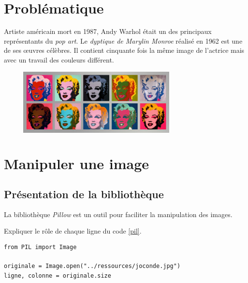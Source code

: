 \documentclass[a4paper,11pt]{article}
\begin{document}
\begin{Form}
\section{Problématique}
Artiste américain mort en 1987, Andy Warhol était un  des principaux représentants du \emph{pop art}.	Le \emph{dyptique de Marylin Monroe} réalisé en 1962 est une de ses œuvres célèbres. Il contient cinquante fois la même image de l'actrice mais avec un travail des couleurs différent.
\begin{figure}[!h]
\centering
\includegraphics[width=8cm]{ressources/marylin.jpg}
\label{monroe}
\end{figure}
\begin{center}
\end{center}
\section{Manipuler une image}
\subsection{Présentation de la bibliothèque}
La bibliothèque \emph{Pillow} est un outil pour faciliter la manipulation des images.
\begin{activite}
Expliquer le rôle de chaque ligne du code \ref{pil}.
\end{activite}
\begin{code}[!h]
\begin{lstlisting}
from PIL import Image

originale = Image.open("../ressources/joconde.jpg")
ligne, colonne = originale.size
\end{lstlisting}
\label{pil}
\end{code}

\end{Form}
\end{document}
